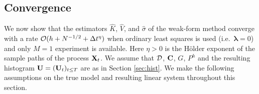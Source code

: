 \documentclass[english,reqno]{amsart}
\begin{document}
\subsection{Convergence}\label{sec:conv}

We now show that the estimators $\widehat{K}$, $\widehat{V}$, and $\widehat{\sigma}$ of the weak-form method converge with a rate ${\mathcal{O}}(h+N^{-1/2}+\Delta t^\eta)$ when ordinary least squares is used (i.e.\ $\pmb{\lambda}=0$) and only $M=1$ experiment is available. Here $\eta>0$ is the H\"older exponent of the sample paths of the process $\mathbf{X}_t$. We assume that ${\mathcal{D}}$, $\mathbf{C}$, $G$, $P^h$ and the resulting histogram $\mathbf{U}=(\mathbf{U}_t)_{t\leq T}$ are as in Section \ref{sec:hist}. We make the following assumptions on the true model and resulting linear system throughout this section.
\end{document}
